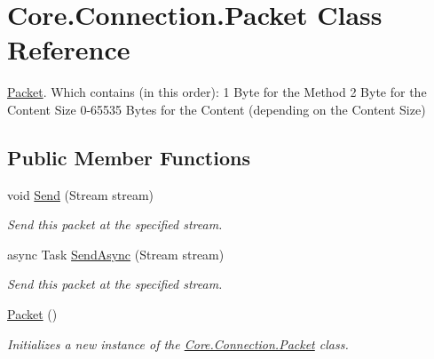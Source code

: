 \hypertarget{classCore_1_1Connection_1_1Packet}{}\section{Core.\+Connection.\+Packet Class Reference}
\label{classCore_1_1Connection_1_1Packet}


\hyperlink{classCore_1_1Connection_1_1Packet}{Packet}. Which contains (in this order)\+: 1 Byte for the Method 2 Byte for the Content Size 0-\/65535 Bytes for the Content (depending on the Content Size)  


\subsection*{Public Member Functions}
\begin{DoxyCompactItemize}
\item 
void \hyperlink{classCore_1_1Connection_1_1Packet_a25212f6b6b5a40fd032510556ceee373}{Send} (Stream stream)
\begin{DoxyCompactList}\small\item\em Send this packet at the specified stream. \end{DoxyCompactList}\item 
async Task \hyperlink{classCore_1_1Connection_1_1Packet_af67ac3683aea5b7590008ba353bbc027}{Send\+Async} (Stream stream)
\begin{DoxyCompactList}\small\item\em Send this packet at the specified stream. \end{DoxyCompactList}\item 
\hyperlink{classCore_1_1Connection_1_1Packet_a2cef09be0adae12e3817a96b3c6a5831}{Packet} ()
\begin{DoxyCompactList}\small\item\em Initializes a new instance of the \hyperlink{classCore_1_1Connection_1_1Packet}{Core.\+Connection.\+Packet} class. \end{DoxyCompactList}\end{DoxyCompactItemize}
